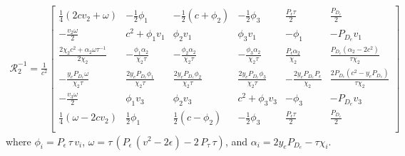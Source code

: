 \begin{align*}
  \mathcal{R}_{2}^{-1} = \frac{1}{c^2}
  \left[
  \begin{array}{cccccc}
   \frac{1}{4} (2 c  v_{2}+\omega ) & -\frac{1}{2} \phi_{1} & -\frac{1}{2} (c+\phi_{2})
    & -\frac{1}{2} \phi_{3}  & \frac{P_{\epsilon} \tau }{2} & \frac{P_{D_{e}}}{2}
     \\
   -\frac{v_{2} \omega }{2} & c^2 + \phi_{1} v_{1}  & \phi_{2} v_{1}  &
     \phi_{3} v_{1}  & -\phi_{1}  & -P_{D_{e}} v_{1}
     \\
   \frac{2 \chi_{2}  c^2+\alpha_{2}  \omega \tau^{-1} }{2 \chi_{2} } & -\frac{\phi_{1} \alpha_{2}  }{\chi_{2} \tau } &
     -\frac{\phi_{2} \alpha_{2}  }{\chi_{2} \tau } & -\frac{\phi_{3} \alpha_{2} }{\chi_{2} \tau } &
     \frac{P_{\epsilon} \alpha_{2} }{\chi_{2} } & \frac{P_{D_{e}} \left(\alpha_{2} -2 c^2\right)}{\tau \chi_{2} }
      \\
   -\frac{y_{e} P_{D_{e}} \omega }{\chi_{2} \tau } & \frac{2 y_{e} P_{D_{e}} \phi_{1} }{\chi_{2} \tau } & \frac{2 y_{e} P_{D_{e}}
     \phi_{2} }{\chi_{2} \tau} & \frac{2 y_{e} P_{D_{e}} \phi_{3} }{\chi_{2} \tau} & -\frac{2 y_{e}
     P_{D_{e}} P_{\epsilon} }{\chi_{2} } & \frac{2 P_{D_{e}} \left(c^2-y_{e} P_{D_{e}} \right)}{\tau \chi_{2} }
      \\
   -\frac{v_{3} \omega }{2} & \phi_{1} v_{3}  & \phi_{2} v_{3}   &
     c^2+\phi_{3} v_{3}  & -\phi_{3}  & -P_{D_{e}} v_{3}
      \\
   \frac{1}{4} (\omega -2 c  v_{2}) & \frac{1}{2} \phi_{1}  & \frac{1}{2} (c-\phi_{2})
       & -\frac{1}{2} \phi_{3}  & \frac{P_{\epsilon} \tau }{2} & \frac{P_{D_{e}}}{2}
     \\
  \end{array}
  \right]
\end{align*}
where $\phi_{i} = P_{\epsilon}\,\tau\, v_{i}$,
$\omega = \tau\, (P_{\epsilon}\,(v^2 - 2\epsilon) - 2\,P_{\tau}\,\tau)$, and
$\alpha_{i} = 2 y_{e} P_{D_{e}} - \tau \chi_{i}$.

